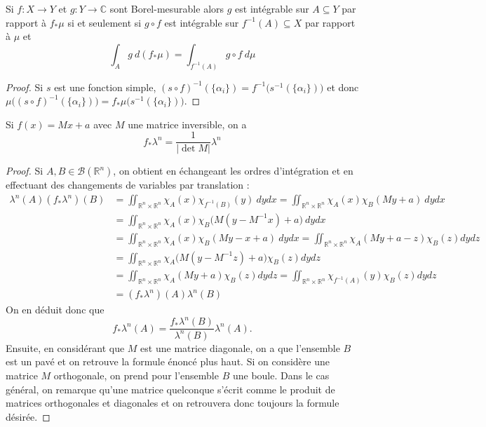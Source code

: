 \begin{theo}
    Si $f:X\to Y$ et $g:Y\to\mathbb{C}$ sont Borel-mesurable alors $g$ est intégrable sur $A\subseteq Y$ par rapport à $f_*\mu$ si et seulement si $g\circ f$ est intégrable sur $f^{-1}(A)\subseteq X$ par rapport à $\mu$ et
    \begin{equation*}
        \int_Ag\ d(f_*\mu) = \int_{f^{-1}(A)}g\circ f \ d\mu
    \end{equation*}
\end{theo}
\begin{proof}
    Si $s$ est une fonction simple, $(s\circ f)^{-1}(\{\alpha_i\}) = f^{-1}\big(s^{-1}(\{\alpha_i\})\big)$ et donc $\mu\big((s\circ f)^{-1}(\{\alpha_i\})\big)=f_*\mu\big(s^{-1}(\{\alpha_i\})\big)$.
\end{proof}

\begin{theo}
    Si $f(x)=Mx+a$ avec $M$ une matrice inversible, on a
    \begin{equation*}
        f_*\lambda^{n} = \frac{1}{|\det M|}\lambda^n
    \end{equation*}
\end{theo}
\begin{proof}
    Si $A,B\in\mathscr{B}(\mathbb{R}^n)$, on obtient en échangeant les ordres d'intégration et en effectuant des changements de variables par translation :
    \begin{align*}
        \lambda^n(A)(f_*\lambda^n)(B) &= \iint_{\mathbb{R}^n\times\mathbb{R}^n} \chi_A(x)\chi_{f^{-1}(B)}(y)\ dydx 
        = \iint_{\mathbb{R}^n\times\mathbb{R}^n} \chi_A(x)\chi_{B}(My+a)\ dydx \\
        &= \iint_{\mathbb{R}^n\times\mathbb{R}^n} \chi_A(x)\chi_{B}\big(M(y-M^{-1}x)+a\big)\ dydx \\
        &= \iint_{\mathbb{R}^n\times\mathbb{R}^n} \chi_A(x)\chi_{B}(My-x+a)\ dydx
        = \iint_{\mathbb{R}^n\times\mathbb{R}^n} \chi_A(My+a-z)\chi_{B}(z) dydz\\
        & = \iint_{\mathbb{R}^n\times\mathbb{R}^n} \chi_A\big(M(y-M^{-1}z)+a\big)\chi_{B}(z) dydz\\
        &= \iint_{\mathbb{R}^n\times\mathbb{R}^n} \chi_A(My+a)\chi_{B}(z) dydz
        = \iint_{\mathbb{R}^n\times\mathbb{R}^n} \chi_{f^{-1}(A)}(y)\chi_{B}(z) dydz\\
        & = (f_*\lambda^n)(A)\lambda^n(B)
    \end{align*}
    On en déduit donc que
    \begin{equation*}
        f_*\lambda^{n}(A) = \frac{f_*\lambda^{n}(B)}{\lambda^n(B)}\lambda^n(A).
    \end{equation*}
    Ensuite, en considérant que $M$ est une matrice diagonale, on a que l'ensemble $B$ est un pavé et on retrouve la formule énoncé plus haut. Si on considère une matrice $M$ orthogonale, on prend pour l'ensemble $B$ une boule. Dans le cas général, on remarque qu'une matrice quelconque s'écrit comme le produit de matrices orthogonales et diagonales et on retrouvera donc toujours la formule désirée.
\end{proof}

